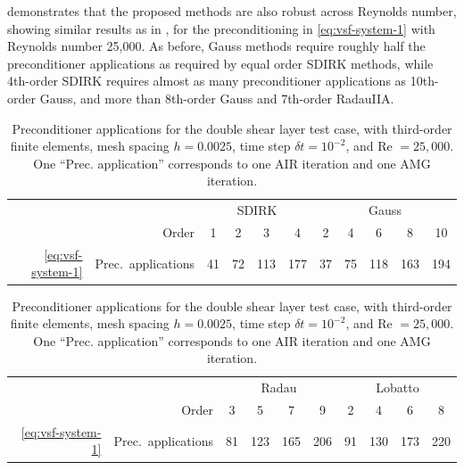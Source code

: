 \documentclass[review]{siamart}
\begin{document}
 demonstrates that the proposed methods are also robust
across Reynolds number, showing similar results as in , for
the preconditioning in \eqref{eq:vsf-system-1} with Reynolds number 25,000.  As
before, Gauss methods require roughly half the preconditioner applications as
required by equal order SDIRK methods, while 4th-order SDIRK requires almost as many
preconditioner applications as 10th-order Gauss, and more than 8th-order Gauss and
7th-order RadauIIA.

\begin{table}[h!]
	\centering
	\caption{Preconditioner applications for the double shear layer test case, with third-order
	finite elements, mesh spacing $h=0.0025$, time step $\delta t = 10^{-2}$, and Re $=25,000$.
	One ``Prec. application'' corresponds to one AIR iteration and one AMG iteration.}
	\label{tab:dsl-iters2}
	\begin{tabular}{rl|cccc|ccccc}
		\toprule
		&& \multicolumn{4}{c|}{SDIRK} & \multicolumn{5}{c}{Gauss} \\
		& \multicolumn{1}{r|}{Order}  & 1 & 2 & 3 & 4 & 2 & 4 & 6 & 8 & 10\\
		\midrule
		\eqref{eq:vsf-system-1} & Prec.\ applications & 41 & 72 & 113 & 177 & 37 & 75 & 118 & 163 & 194 \\
		\bottomrule
	\end{tabular}

	\vspace{\floatsep}

	\begin{tabular}{rl|cccc|cccc}
		\toprule
		&& \multicolumn{4}{c|}{Radau} & \multicolumn{4}{c}{Lobatto} \\
		& \multicolumn{1}{r|}{Order} & 3 & 5 & 7 & 9 & 2 & 4 & 6 & 8\\
		\midrule
		\eqref{eq:vsf-system-1} & Prec.\ applications & 81 & 123 & 165 & 206 & 91 & 130 & 173 & 220 \\
		\bottomrule
	\end{tabular}
\end{table}
\end{document}
